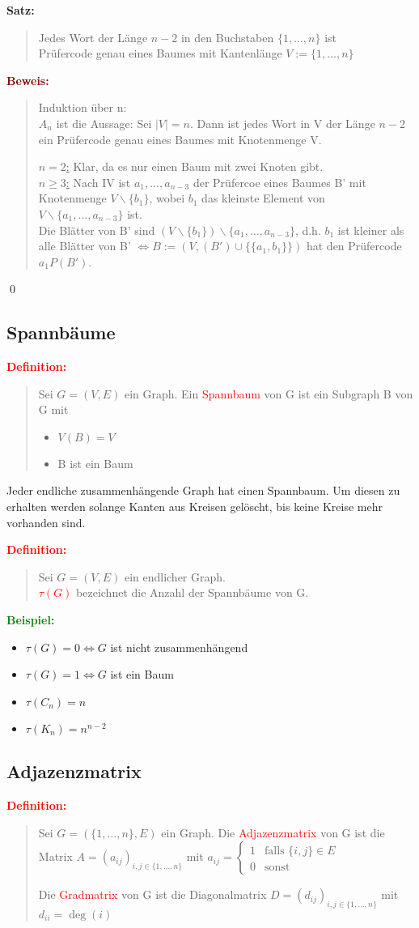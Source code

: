 \documentclass{article}
\newcommand{\red}[1]{\textcolor{red}{#1}}
\newcommand{\green}[1]{\textcolor{green}{#1}}
\newcommand{\dgr}[1]{\textcolor{dgr}{#1}}
\newcommand{\maroon}[1]{\textcolor{maroon}{#1}}
\newcommand{\ex}{\green{\textbf{Beispiel: }}}
\newcommand{\de}[1]{\red{\textbf{Definition: }}\begin{quote}#1\end{quote}}
\newcommand{\se}[1]{\dgr{\textbf{Satz: }}\begin{quote}#1\end{quote}}
\newcommand{\pr}[1]{\maroon{\textbf{Beweis: }}\begin{quote}#1\end{quote}\qed}
\newcommand{\bs}{\backslash}
\begin{document}
\newpage
\se{
    Jedes Wort der Länge $n-2$ in den Buchstaben $\{1, \dots, n\}$ ist\\
    Prüfercode genau eines Baumes mit Kantenlänge $V := \{1, \dots, n\}$
}
\pr{
    Induktion über n:\\
    \underline{$A_n$} ist die Aussage: Sei $|V| = n$. Dann ist jedes Wort in V der Länge $n-2$ ein Prüfercode genau eines Baumes mit Knotenmenge V.

    \underline{$n = 2$:} Klar, da es nur einen Baum mit zwei Knoten gibt.\\
    \underline{$n \geq 3$:} Nach IV ist $a_1, \dots, a_{n-3}$ der Prüfercoe eines Baumes B' mit Knotenmenge $V \bs \{b_1\}$, wobei $b_1$ das kleinste Element von\\
    $V \bs \{a_1, \dots, a_{n-3}\}$ ist.\\
    Die Blätter von B' sind $(V \bs \{b_1\}) \bs \{a_1, \dots, a_{n-3}\}$, d.h. $b_1$ ist kleiner als alle Blätter von B' $\iff B := (V, (B') \cup \{\{a_1, b_1\}\})$ hat den Prüfercode $a_1P(B')$.
}

\subsection{Spannbäume}

\de{
    Sei $G = (V,E)$ ein Graph. Ein \red{Spannbaum} von G ist ein Subgraph B von G mit
    \begin{itemize}
        \item $V(B) = V$
        \item B ist ein Baum
    \end{itemize}
}

Jeder endliche zusammenhängende Graph hat einen Spannbaum. Um diesen zu erhalten werden solange Kanten aus Kreisen gelöscht, bis keine Kreise mehr vorhanden sind.

\de{
    Sei $G = (V,E)$ ein endlicher Graph.\\
    \red{$\tau(G)$} bezeichnet die Anzahl der Spannbäume von G.
}

\ex \begin{itemize}
    \item $\tau(G) = 0 \iff G$ ist nicht zusammenhängend
    \item $\tau(G) = 1 \iff G$ ist ein Baum
    \item $\tau(C_n) = n$
    \item $\tau(K_n) = n^{n-2}$
\end{itemize}

\subsection{Adjazenzmatrix}
\de{
    Sei $G = (\{1, \dots, n\}, E)$ ein Graph. Die \red{Adjazenzmatrix} von G ist die Matrix $A = (a_{ij})_{i,j \in \{1, \dots, n\}}$ mit $a_{ij} = \begin{cases}
        1 & \text{falls } \{i,j\} \in E\\
        0 & \text{sonst}
    \end{cases}$

    Die \red{Gradmatrix} von G ist die Diagonalmatrix $D = (d_{ij})_{i,j \in \{1, \dots, n\}}$ mit $d_{ii} = \deg(i)$
}
\end{document}
